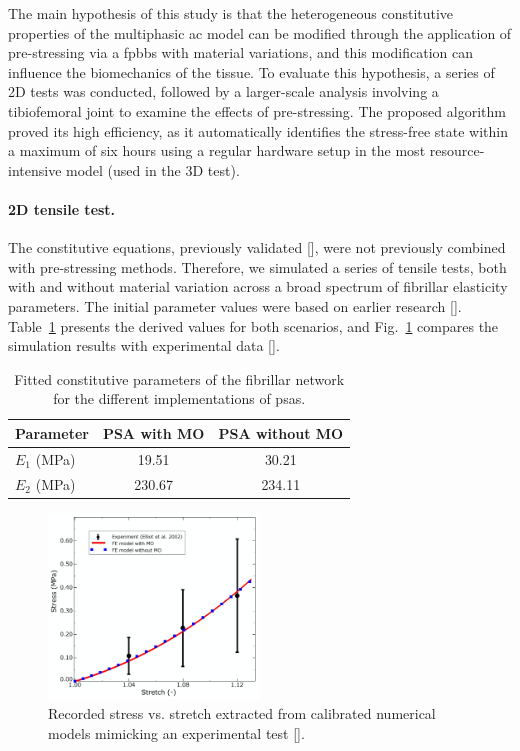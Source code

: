 The main hypothesis of this study is that the heterogeneous constitutive properties of the multiphasic \ac{ac} model can be modified through the application of  pre-stressing via a \ac{fpbbs} with material variations, and this modification can influence the biomechanics of the tissue. To evaluate this hypothesis, a series of 2D tests was conducted, followed by a larger-scale analysis involving a tibiofemoral joint to examine the effects of pre-stressing. The proposed algorithm proved its high efficiency, as it automatically identifies the stress-free state within a maximum of six hours using a regular hardware setup in the most resource-intensive model (used in the 3D test).

\paragraph{2D tensile test.} The constitutive equations, previously validated [\cite{sajjadinia2019}], were not previously combined with pre-stressing methods. Therefore, we simulated a series of tensile tests, both with and without material variation across a broad spectrum of fibrillar elasticity parameters. The initial parameter values were based on earlier research [\cite{wilson2007}]. Table~\ref{table:calibraion} presents the derived values for both scenarios, and Fig.~\ref{fig:calibration} compares the simulation results with experimental data [\cite{elliott2002}].
%
\begin{table}[b!]\centering
\caption{Fitted constitutive parameters of the fibrillar network for the different implementations of \acp{psa}.}
\label{table:calibraion}
\begin{tabular}{lcc}
\hline
\textbf{Parameter}  
& \textbf{PSA with MO}
& \textbf{PSA without MO}
\\
\hline
$E_1$ (MPa) 
& 19.51&    30.21 
\\
$E_2$ (MPa) & 230.67&    234.11 \\
\hline
\end{tabular}
\end{table}
%
\begin{figure}\centering
\includegraphics[width=0.5\textwidth]{img/calibration.jpg}
\caption{Recorded stress vs. stretch extracted from calibrated numerical models mimicking an experimental test [\cite{elliott2002}].}
\label{fig:calibration}
\end{figure}

